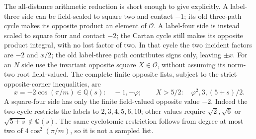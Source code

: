 \documentclass[11pt]{article}
\begin{document}
The all-distance arithmetic reduction is short enough to give
explicitly. A label-three side can be field-scaled to square two
and contact $-1$; its old three-path cycle makes its opposite
product an element of $\mathcal O$. A label-four side is instead
scaled to square four and contact $-2$; the Cartan cycle still
makes its opposite product integral, with no lost factor of two.
In that cycle the two incident factors are $-2$ and $x/2$;
the old label-three path contributes signs only, leaving $\pm x$.
For an $N$ side use the invariant opposite square $X\in\mathcal O$,
without assuming its norm-two root field-valued. The complete finite
opposite lists, subject to the strict opposite-corner inequalities,
are
\[
 x=-2\cos(\pi/m)\in\mathbb Q(s):\quad-1,-\varphi;
 \qquad X>5/2:\quad\varphi^2,3,(5+s)/2.
\]
A square-four side has only the finite field-valued opposite value
$-2$. Indeed the two-cycle restricts the labels to $2,3,4,5,6,10$;
other values require $\sqrt2,\sqrt6$ or $\sqrt{5+s}\notin\mathbb Q(s)$.
The same cyclotomic restriction follows from degree at most two of
$4\cos^2(\pi/m)$, so it is not a sampled list.
\end{document}
